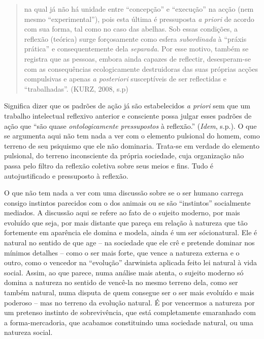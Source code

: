 \begin{quote}
na qual já não há unidade entre ``concepção'' e ``execução'' na acção
(nem mesmo ``experimental''), pois esta última é pressuposta \emph{a
priori} de acordo com sua forma, tal como no caso das abelhas. Sob essas
condições, a reflexão (teórica) surge forçosamente como esfera
\emph{subordinada} à ``práxis prática'' e consequentemente dela
\emph{separada}. Por esse motivo, também se registra que as pessoas,
embora ainda capazes de reflectir, desesperam-se com as consequências
ecologicamente destruidoras das suas próprias acções compulsivas e
apenas \emph{a posteriori} susceptíveis de ser reflectidas e
``trabalhadas''. (KURZ, 2008, s.p)
\end{quote}

Significa dizer que os padrões de ação já são estabelecidos \emph{a
priori} sem que um trabalho intelectual reflexivo anterior e consciente
possa julgar esses padrões de ação que ``são quase \emph{ontologicamente
pressupostos} à reflexão.'' (\emph{Idem}, s.p.). O que se argumenta aqui
não tem nada a ver com o elemento pulsional do homem, como terreno de
seu psiquismo que ele não dominaria. Trata-se em verdade do elemento
pulsional, do terreno inconsciente da própria sociedade, cuja
organização não passa pelo filtro da reflexão coletiva sobre seus meios
e fins. Tudo é autojustificado e pressuposto à reflexão.

O que não tem nada a ver com uma discussão sobre se o ser humano carrega
consigo instintos parecidos com o dos animais ou se são ``instintos''
socialmente mediados. A discussão aqui se refere ao fato de o sujeito
moderno, por mais evoluído que seja, por mais distante que pareça em
relação à natureza que tão fortemente em aparência ele domina e modela,
ainda é um ser sócionatural. Ele é natural no sentido de que age -- na
sociedade que ele crê e pretende dominar nos mínimos detalhes -- como o
ser mais forte, que vence a natureza externa e o outro, como o vencedor
na ``evolução'' darwinista aplicada feito lei natural à vida social.
Assim, ao que parece, numa análise mais atenta, o sujeito moderno só
domina a natureza no sentido de vencê-la no mesmo terreno dela, como ser
também natural, numa disputa de quem consegue ser o ser mais evoluído e
mais poderoso -- mas no terreno da evolução natural. É por vencermos a
natureza por um pretenso instinto de sobrevivência, que está
completamente emaranhado com a forma-mercadoria, que acabamos
constituindo uma sociedade natural, ou uma natureza social.

